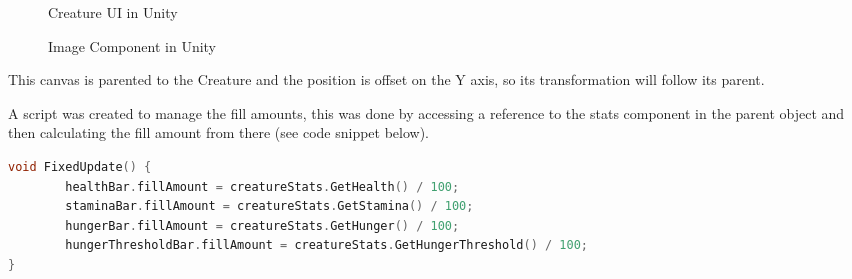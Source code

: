 \documentclass[11pt]{report}
\begin{document}
\begin{figure}[H]
    \begin{minipage}{.5\textwidth}
        \centering
        \caption{Creature UI in Unity}
    \end{minipage}
    \begin{minipage}{.5\textwidth}
        \centering
        \caption{Image Component in Unity}
    \end{minipage}
\end{figure}

This canvas is parented to the Creature and the position is offset on the Y axis, so its transformation will follow its parent.

A script was created to manage the fill amounts, this was done by accessing a reference to the stats component in the parent object and then calculating the fill amount from there (see code snippet below).

\begin{lstlisting}[language=c]
void FixedUpdate() {
        healthBar.fillAmount = creatureStats.GetHealth() / 100;
        staminaBar.fillAmount = creatureStats.GetStamina() / 100;
        hungerBar.fillAmount = creatureStats.GetHunger() / 100;
        hungerThresholdBar.fillAmount = creatureStats.GetHungerThreshold() / 100;
}
\end{lstlisting}
\end{document}
